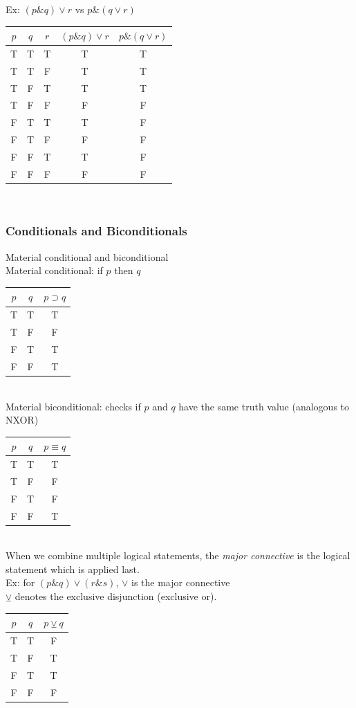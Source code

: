 \documentclass[11pt, fleqn]{article}
\begin{document}
Ex: $(p\&q)\vee r$ vs $p\&(q\vee r)$\\
\begin{tabular}{c|c|c|c|c}
    $p$ & $q$ & $r$ & $(p\&q)\vee r$ & $p\&(q\vee r)$\\
    \hline
    T & T & T & T & T\\
    T & T & F & T & T\\
    T & F & T & T & T\\
    T & F & F & F & F\\
    F & T & T & T & F\\
    F & T & F & F & F\\
    F & F & T & T & F\\
    F & F & F & F & F
\end{tabular}\\

\subsubsection{Conditionals and Biconditionals}
Material conditional and biconditional\\
Material conditional: if $p$ then $q$\\
\begin{tabular}{c|c|c}
    $p$ & $q$ & $p\supset q$\\
    \hline
    T & T & T\\
    T & F & F\\
    F & T & T\\
    F & F & T
\end{tabular}\\

Material biconditional: checks if $p$ and $q$ have the same truth value (analogous to NXOR)\\
\begin{tabular}{c|c|c}
    $p$ & $q$ & $p\equiv q$\\
    \hline
    T & T & T\\
    T & F & F\\
    F & T & F\\
    F & F & T
\end{tabular}\\

When we combine multiple logical statements, the \textit{major connective} is the logical statement which is applied last.\\
Ex: for $(p\&q)\vee(r\&s)$, $\vee$ is the major connective\\

$\veebar$ denotes the exclusive disjunction (exclusive or).\\
\begin{tabular}{c|c|c}
    $p$ & $q$ & $p\veebar q$\\
    \hline
    T & T & F\\
    T & F & T\\
    F & T & T\\
    F & F & F
\end{tabular}\\
\end{document}
